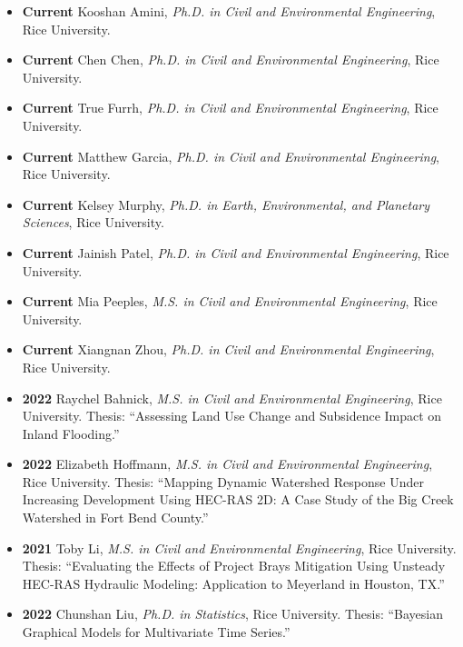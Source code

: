 \documentclass[10pt,oneside]{article}
\begin{document}
\mbox{}\vspace{-\dimexpr\baselineskip\relax}

\begin{itemize}[label={}]

  
    \item \textbf{Current} Kooshan Amini, \textit{Ph.D. in Civil and Environmental Engineering}, Rice University. 
  
    \item \textbf{Current} Chen Chen, \textit{Ph.D. in Civil and Environmental Engineering}, Rice University. 
  
    \item \textbf{Current} True Furrh, \textit{Ph.D. in Civil and Environmental Engineering}, Rice University. 
  
    \item \textbf{Current} Matthew Garcia, \textit{Ph.D. in Civil and Environmental Engineering}, Rice University. 
  
    \item \textbf{Current} Kelsey Murphy, \textit{Ph.D. in Earth, Environmental, and Planetary Sciences}, Rice University. 
  
    \item \textbf{Current} Jainish Patel, \textit{Ph.D. in Civil and Environmental Engineering}, Rice University. 
  
    \item \textbf{Current} Mia Peeples, \textit{M.S. in Civil and Environmental Engineering}, Rice University. 
  
    \item \textbf{Current} Xiangnan Zhou, \textit{Ph.D. in Civil and Environmental Engineering}, Rice University. 
  
  
  
    \item \textbf{2022} \quad Raychel Bahnick, \textit{M.S. in Civil and Environmental Engineering}, Rice University. Thesis: \enquote{Assessing Land Use Change and Subsidence Impact on Inland Flooding.}
  
    \item \textbf{2022} \quad Elizabeth Hoffmann, \textit{M.S. in Civil and Environmental Engineering}, Rice University. Thesis: \enquote{Mapping Dynamic Watershed Response Under Increasing Development Using HEC-RAS 2D: A Case Study of the Big Creek Watershed in Fort Bend County.}
  
    \item \textbf{2021} \quad Toby Li, \textit{M.S. in Civil and Environmental Engineering}, Rice University. Thesis: \enquote{Evaluating the Effects of Project Brays Mitigation Using Unsteady HEC-RAS Hydraulic Modeling: Application to Meyerland in Houston, TX.}
  
    \item \textbf{2022} \quad Chunshan Liu, \textit{Ph.D. in Statistics}, Rice University. Thesis: \enquote{Bayesian Graphical Models for Multivariate Time Series.}
  
\end{itemize}
\end{document}
